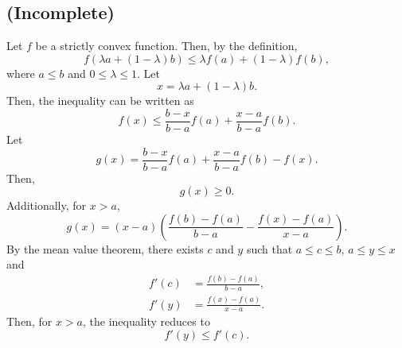 \subsection{(Incomplete)}
\label{1.36}
Let $f$ be a strictly convex function.
Then, by the definition,
%
\begin{equation}
f \left( \lambda a + (1 - \lambda) b \right) \leq \lambda f(a) + (1 - \lambda) f(b),
\end{equation}
%
where $a \leq b$ and $0 \leq \lambda \leq 1$.
Let
%
\begin{equation}
x = \lambda a + (1 - \lambda) b.
\end{equation}
%
Then, the inequality can be written as
%
\begin{equation}
f(x) \leq \frac{b - x}{b - a} f(a) + \frac{x - a}{b - a} f(b).
\end{equation}
%
Let 
%
\begin{equation}
g(x) = \frac{b - x}{b - a} f(a) + \frac{x - a}{b - a} f(b) - f(x).
\end{equation}
%
Then,
%
\begin{equation}
g(x) \geq 0.
\end{equation}
%
Additionally, for $x > a$,
%
\begin{equation}
g(x) = (x - a) \left( \frac{f(b) - f(a)}{b - a} - \frac{f(x) - f(a)}{x - a} \right).
\end{equation}
%
By the mean value theorem, there exists $c$ and $y$ such that $a \leq c \leq b$, $a \leq y \leq x$ and
%
\begin{equation}
\begin{aligned}
f'(c) &= \frac{f(b) - f(a)}{b - a}, \\
f'(y) &= \frac{f(x) - f(a)}{x - a}.
\end{aligned}
\end{equation}
%
Then, for $x > a$, the inequality reduces to
%
\begin{equation}
f'(y) \leq f'(c). 
\end{equation}
%



